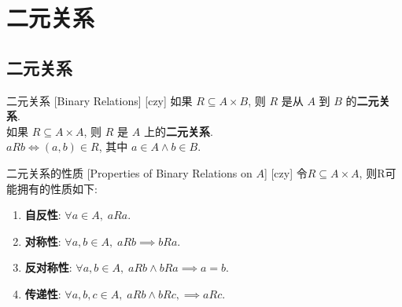 \documentclass[UTF8]{ctexart}
\begin{document}
\section{二元关系}

    \subsection{二元关系}
        \begin{dfn}
            [UUID]
            {二元关系}
            [Binary Relations]
            [czy]
            如果 \( R \subseteq A \times B \), 则 \( R \) 是从 \( A \) 到 \( B \) 的\textbf{二元关系}. \\
            如果 \( R \subseteq A \times A \), 则 \( R \) 是 \( A \) 上的\textbf{二元关系}. \\
            \( a R b \iff (a, b) \in R \), 其中 \( a \in A \land b \in B \). 
        \end{dfn}

        \begin{dfn}
            [UUID]
            {二元关系的性质}
            [Properties of Binary Relations on \( A \)]
            [czy]
            令\( R \subseteq A \times A \), 则R可能拥有的性质如下: 
            \begin{enumerate}
                \item \textbf{自反性}: \( \forall a \in A, \; a R a \). 
                \item \textbf{对称性}: \( \forall a, b \in A, \; a R b \implies b R a \). 
                \item \textbf{反对称性}: \( \forall a, b \in A, \; a R b \land b R a \implies a = b \). 
                \item \textbf{传递性}: \( \forall a, b, c \in A, \;  a R b \land b R c, \implies a R c \). 
            \end{enumerate}
        \end{dfn}
\end{document}
